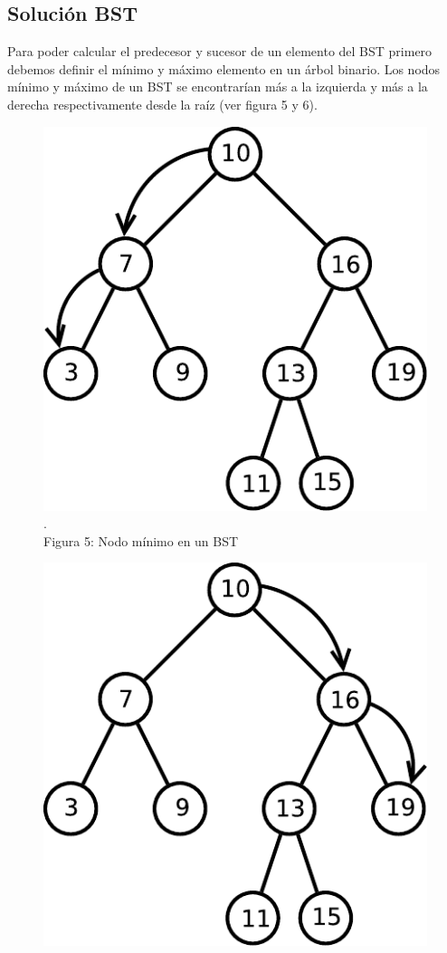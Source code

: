 \documentclass[11pt]{article}
\begin{document}
\subsection{Solución BST}
Para poder calcular el predecesor y sucesor de un elemento del BST primero debemos definir el mínimo y máximo elemento en un árbol binario. Los nodos mínimo y máximo de un BST se encontrarían más a la izquierda y más a la derecha respectivamente desde la raíz (ver figura 5 y 6). 
\begin{figure}[htp]
\centering
\begin{minipage}{.4\textwidth}
\centering
\includegraphics[scale=0.5]{min_arbol.pdf}
\\\scriptsize{\color{white}.\color{black}\\Figura 5: Nodo mínimo en un BST}
\label{etiqueta}
\end{minipage}
\begin{minipage}{.4\textwidth}
\centering
\includegraphics[scale=0.5]{max_arbol.pdf}

\end{minipage}
\end{figure}
\end{document}

